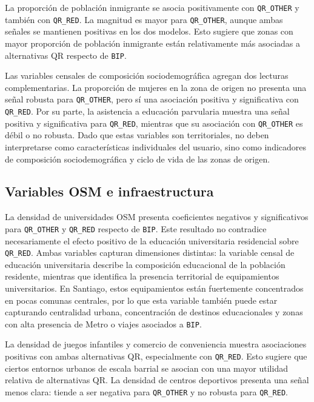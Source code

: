La proporción de población inmigrante se asocia positivamente con \texttt{QR\_OTHER} y también con
\texttt{QR\_RED}. La magnitud es mayor para \texttt{QR\_OTHER}, aunque ambas señales se mantienen
positivas en los dos modelos. Esto sugiere que zonas con mayor proporción de población inmigrante
están relativamente más asociadas a alternativas QR respecto de \texttt{BIP}.

Las variables censales de composición sociodemográfica agregan dos lecturas complementarias. La proporción de mujeres en la
zona de origen no presenta una señal robusta para \texttt{QR\_OTHER}, pero sí una asociación positiva
y significativa con \texttt{QR\_RED}. Por su parte, la asistencia a educación parvularia muestra una
señal positiva y significativa para \texttt{QR\_RED}, mientras que su asociación con
\texttt{QR\_OTHER} es débil o no robusta. Dado que estas variables son territoriales, no deben
interpretarse como características individuales del usuario, sino como indicadores de composición
sociodemográfica y ciclo de vida de las zonas de origen.

\subsection{Variables OSM e infraestructura}

La densidad de universidades OSM presenta coeficientes negativos y significativos para
\texttt{QR\_OTHER} y \texttt{QR\_RED} respecto de \texttt{BIP}. Este resultado no contradice
necesariamente el efecto positivo de la educación universitaria residencial sobre \texttt{QR\_RED}.
Ambas variables capturan dimensiones distintas: la variable censal de educación universitaria
describe la composición educacional de la población residente, mientras que
 identifica la presencia territorial de equipamientos
universitarios. En Santiago, estos equipamientos están fuertemente concentrados en pocas comunas
centrales, por lo que esta variable también puede estar capturando centralidad urbana, concentración
de destinos educacionales y zonas con alta presencia de Metro o viajes asociados a \texttt{BIP}.

La densidad de juegos infantiles y comercio de conveniencia muestra asociaciones positivas con ambas
alternativas QR, especialmente con \texttt{QR\_RED}. Esto sugiere que ciertos entornos urbanos de
escala barrial se asocian con una mayor utilidad relativa de alternativas QR. La densidad de centros
deportivos presenta una señal menos clara: tiende a ser negativa para \texttt{QR\_OTHER} y no robusta
para \texttt{QR\_RED}.


